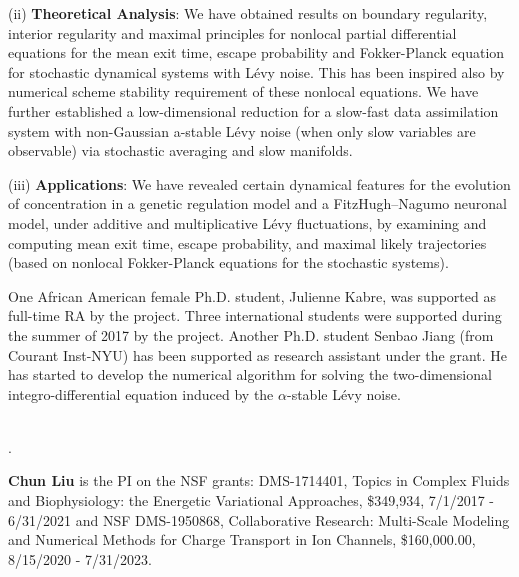 \documentclass[11pt]{article}
\begin{document}
(ii)  \textbf{Theoretical Analysis}:
We have obtained results on  boundary regularity, interior regularity and maximal principles for   nonlocal partial differential equations for the mean   exit time,   escape probability and Fokker-Planck equation for stochastic dynamical systems with L\'evy noise. This has been inspired also by numerical scheme stability requirement of these nonlocal equations. We have further established a  low-dimensional reduction for a slow-fast data assimilation system with non-Gaussian a-stable L\'evy noise (when only slow variables are observable) via stochastic averaging and slow manifolds.

(iii)   \textbf{Applications}:
   We have revealed certain  dynamical features  for  the evolution of concentration in a genetic regulation model and a
   FitzHugh–Nagumo   neuronal model,   under additive and multiplicative     L\'evy fluctuations, by examining and computing mean exit time, escape probability, and maximal likely trajectories (based on nonlocal Fokker-Planck equations for the stochastic systems).



 One African American female Ph.D. student, Julienne Kabre, was supported as full-time RA by the project. Three international students were supported during the summer of 2017 by the project.    Another Ph.D. student Senbao Jiang (from Courant Inst-NYU)  has been supported as research assistant under the grant. He has started to develop the numerical algorithm for solving the two-dimensional integro-differential equation induced by the $\alpha$-stable L\'evy noise.
 
 
\medskip

\\
 \cite{Wang2018NumericalAF, ChenXL2020, GaoTing2016, Gao2016, ZhangZhuanDuan, ZhengDuan2017, DannyTesfay,QiaoDuan2018,YangDuanWiggins2020,ZhengYY2020}.




 




\noindent\textbf{Chun Liu} is the PI on the NSF grants: DMS-1714401,  Topics in Complex Fluids and Biophysiology: the Energetic Variational Approaches, \$349,934, 7/1/2017 - 6/31/2021 and 
{NSF DMS-1950868, Collaborative Research: Multi-Scale Modeling and Numerical Methods for Charge Transport in Ion Channels, \$160,000.00, 8/15/2020 - 7/31/2023.}
\end{document}
